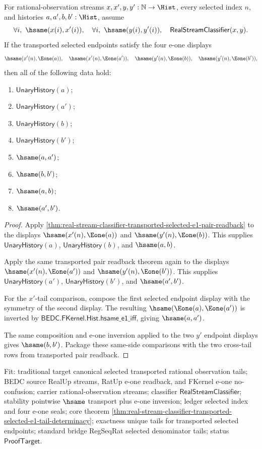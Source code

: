\begin{theorem}
\label{thm:real-stream-classifier-transported-selected-e1-tail-determinacy}
For rational-observation streams $x,x',y,y':\mathbb{N}\to\Hist$, every selected
index $n$, and histories $a,a',b,b':\Hist$, assume
$$
\forall i,\ \hsame(x(i),x'(i)),\quad
\forall i,\ \hsame(y(i),y'(i)),\quad
\mathsf{RealStreamClassifier}(x,y).
$$
If the transported selected endpoints satisfy the four e-one displays
$$
\hsame(x'(n),\Eone(a)),\quad
\hsame(x'(n),\Eone(a')),\quad
\hsame(y'(n),\Eone(b)),\quad
\hsame(y'(n),\Eone(b')),
$$
then all of the following data hold:
\begin{enumerate}
\item $\mathsf{UnaryHistory}(a)$;
\item $\mathsf{UnaryHistory}(a')$;
\item $\mathsf{UnaryHistory}(b)$;
\item $\mathsf{UnaryHistory}(b')$;
\item $\hsame(a,a')$;
\item $\hsame(b,b')$;
\item $\hsame(a,b)$;
\item $\hsame(a',b')$.
\end{enumerate}
\end{theorem}
\begin{proof}
Apply \autoref{thm:real-stream-classifier-transported-selected-e1-pair-readback}
to the displays $\hsame(x'(n),\Eone(a))$ and
$\hsame(y'(n),\Eone(b))$. This supplies $\mathsf{UnaryHistory}(a)$,
$\mathsf{UnaryHistory}(b)$, and $\hsame(a,b)$.

Apply the same transported pair readback theorem again to the displays
$\hsame(x'(n),\Eone(a'))$ and $\hsame(y'(n),\Eone(b'))$. This supplies
$\mathsf{UnaryHistory}(a')$, $\mathsf{UnaryHistory}(b')$, and
$\hsame(a',b')$.

For the $x'$-tail comparison, compose the first selected endpoint display with
the symmetry of the second display. The resulting
$\hsame(\Eone(a),\Eone(a'))$ is inverted by
$\mathsf{BEDC.FKernel.Hist.hsame\_e1\_iff}$, giving $\hsame(a,a')$.

The same composition and e-one inversion applied to the two $y'$ endpoint
displays gives $\hsame(b,b')$. Package these same-side comparisons with the two
cross-tail rows from transported pair readback.
\end{proof}

Fit: traditional target canonical selected transported rational observation
tails; BEDC source RealUp streams, RatUp e-one readback, and FKernel e-one
no-confusion; carrier rational-observation streams; classifier
$\mathsf{RealStreamClassifier}$; stability pointwise $\hsame$ transport plus
e-one inversion; ledger selected index and four e-one seals; core theorem
\autoref{thm:real-stream-classifier-transported-selected-e1-tail-determinacy};
exactness unique tails for transported selected endpoints; standard bridge
RegSeqRat selected denominator tails; status $\mathsf{ProofTarget}$.
